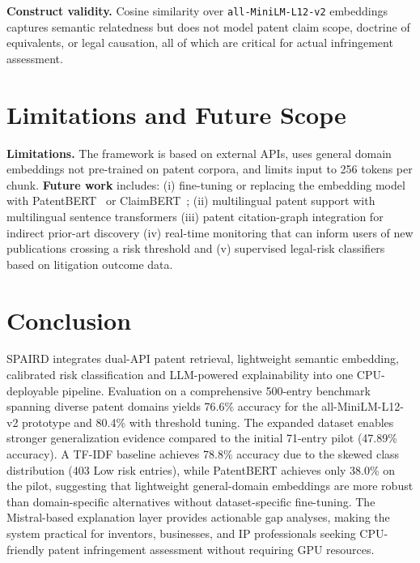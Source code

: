 \documentclass[conference]{IEEEtran}
\begin{document}
\textbf{Construct validity.}
Cosine similarity over \texttt{all-MiniLM-L12-v2} embeddings captures semantic relatedness but does not model patent claim scope, doctrine of equivalents, or legal causation, all of which are critical for actual infringement assessment.

\section{Limitations and Future Scope}

\textbf{Limitations.}
The framework is based on external APIs, uses general domain embeddings not pre-trained on patent corpora, and limits input to 256 tokens per chunk.
\textbf{Future work} includes: (i) fine-tuning or replacing the
embedding model with PatentBERT~\cite{srebrovic2020patbert} or
ClaimBERT~\cite{liu2023claimbert}; (ii) multilingual patent support with multilingual sentence transformers (iii) patent citation-graph integration for indirect prior-art discovery (iv) real-time monitoring that can inform users of new publications crossing a risk threshold and (v) supervised legal-risk classifiers based on litigation outcome data.

\section{Conclusion}

SPAIRD integrates dual-API patent retrieval, lightweight semantic embedding, calibrated risk classification and LLM-powered explainability into one CPU-deployable pipeline.
Evaluation on a comprehensive 500-entry benchmark spanning diverse patent domains yields 76.6\% accuracy for the all-MiniLM-L12-v2 prototype and 80.4\% with threshold tuning. The expanded dataset enables stronger generalization evidence compared to the initial 71-entry pilot (47.89\% accuracy). 
A TF-IDF baseline achieves 78.8\% accuracy due to the skewed class distribution (403 Low risk entries), while PatentBERT achieves only 38.0\% on the pilot, suggesting that lightweight general-domain embeddings are more robust than domain-specific alternatives without dataset-specific fine-tuning.
The Mistral-based explanation layer provides actionable gap analyses, making the system practical for inventors, businesses, and IP professionals seeking CPU-friendly patent infringement assessment without requiring GPU resources.
\end{document}
